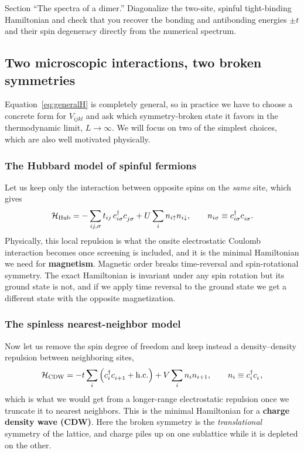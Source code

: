 \documentclass[lecture_notes.tex]{subfiles}
\begin{document}
\begin{notebook}
Section ``The spectra of a dimer.'' Diagonalize the two-site, spinful tight-binding Hamiltonian
and check that you recover the bonding and antibonding energies $\pm t$ and their spin
degeneracy directly from the numerical spectrum.
\end{notebook}

\subsection{Two microscopic interactions, two broken symmetries}
Equation~\eqref{eq:generalH} is completely general, so in practice we have to choose a concrete
form for $V_{ijkl}$ and ask which symmetry-broken state it favors in the thermodynamic limit,
$L\to\infty$. We will focus on two of the simplest choices, which are also well motivated
physically.

\subsubsection{The Hubbard model of spinful fermions}
Let us keep only the interaction between
opposite spins on the \emph{same} site, which gives
\begin{equation}
  \Ham_{\mathrm{Hub}} = -\sum_{ij,\sigma} t_{ij}\, \cre{i\sigma}\ann{j\sigma}
    + U \sum_i n_{i\up} n_{i\dn}, \qquad n_{i\sigma} \equiv \cre{i\sigma}\ann{i\sigma}.
  \label{eq:hubbard}
\end{equation}
Physically, this local repulsion is what the onsite electrostatic Coulomb interaction becomes
once screening is included, and it is the minimal Hamiltonian we need for \textbf{magnetism}.
Magnetic order breaks time-reversal and spin-rotational symmetry. The exact Hamiltonian is
invariant under any spin rotation but its ground state is not, and if we apply time reversal to
the ground state we get a different state with the opposite magnetization.

\subsubsection{The spinless nearest-neighbor model}
Now let us remove the spin degree of freedom and
keep instead a density--density repulsion between neighboring sites,
\begin{equation}
  \Ham_{\mathrm{CDW}} = -t\sum_i \left(\cre{i}\ann{i+1} + \mathrm{h.c.}\right)
    + V \sum_i n_i n_{i+1}, \qquad n_i \equiv \cre{i}\ann{i},
  \label{eq:cdwmodel}
\end{equation}
which is what we would get from a longer-range electrostatic repulsion once we truncate it to
nearest neighbors. This is the minimal Hamiltonian for a \textbf{charge density wave (CDW)}.
Here the broken symmetry is the \emph{translational} symmetry of the lattice, and charge piles up
on one sublattice while it is depleted on the other.
\end{document}
